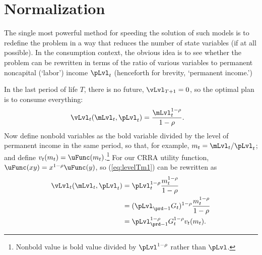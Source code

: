 \hypertarget{normalization}{}
\section{Normalization}\label{sec:normalization}

The single most powerful method for speeding the solution of such models is to redefine the problem in a way that reduces the number of state variables (if at all possible).  In the consumption context, the obvious idea is to see whether the problem can be rewritten in terms of the ratio of various variables to permanent noncapital (`labor') income $\pLvl_{t}$ (henceforth for brevity, `permanent income.')

In the last {period} of life $T$, there is no future, $\vLvl_{T+1} = 0$, so the optimal plan is to consume everything:
\begin{equation}\begin{gathered}\begin{aligned}
      \vLvl_{t}(\mLvl_{t},\pLvl_{t})  & = \frac{\mLvl_{t}^{1-\rho}}{1-\rho}. \label{eq:levelTm1}
    \end{aligned}\end{gathered}\end{equation}
Now define nonbold variables as the bold variable divided by the level of permanent income in the same period, so that, for example, $m_{t}=\mLvl_{t}/\pLvl_{t}$; and define $v_{t}(m_{t}) = \uFunc(m_{t})$.\footnote{Nonbold value is bold value divided by $\pLvl^{1-\rho}$ rather than $\pLvl$.}  For our CRRA utility function, $\uFunc(xy)=x^{1-\rho}\uFunc(y)$, so (\ref{eq:levelTm1}) can be rewritten as
\begin{equation}\begin{gathered}\begin{aligned}
      \vLvl_{t}(\mLvl_{t},\pLvl_{t}) & = \pLvl_{t}^{1-\rho}\frac{{m}_{t}^{1-\rho}}{1-\rho}                       \\
                                                & = (\pLvl_{\prd-1}G_{t})^{1-\rho}\frac{{m}_{t}^{1-\rho}}{1-\rho} \\
                                                &= \pLvl_{\prd-1}^{1-\rho}G_{t}^{1-\rho}v_{t}(m_{t}). \label{eq:vT}
    \end{aligned}\end{gathered}\end{equation}

